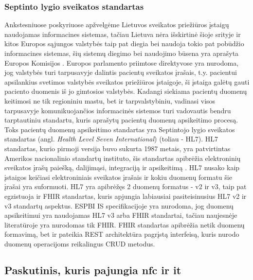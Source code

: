 \subsubsection{Septinto lygio sveikatos standartas}
Ankstesniuose poskyriuose apžvelgėme Lietuvos sveikatos priežiūros įstaigų naudojamas informacines sistemas, tačiau Lietuva nėra išskirtinė šioje srityje ir kitos Europos sąjungos valstybės taip pat diegia bei naudoja tokio pat pobūdžio informacines sistemas, šių sistemų diegimo bei naudojimo būsena yra aprašyta Europos Komisijos \cite{EuroposKomisija}. Europos parlamento priimtose direktyvose \cite{EuroposParlamentas} yra nurodoma, jog valstybės turi tarpusavyje dalintis pacientų sveikatos įrašais, t.y. pacientui apsilankius svetimos valstybės sveikatos priežiūros įstaigoje, ši įstaiga galėtų gauti paciento duomenis iš jo gimtosios valstybės. Kadangi siekiama pacientų duomenų keitimosi ne tik regioniniu mastu, bet ir tarpvalstybiniu, vadinasi visos tarpusavyje komunikuojančios informacinės sistemos turi vadovautis bendru tarptautiniu standartu, kuris aprašytų pacientų duomenų apsikeitimo procesą. Toks pacientų duomenų apsikeitimo standartas yra Septintojo lygio sveikatos standartas (angl. \textit{Health Level Seven International}) (toliau - HL7). HL7 standartas, kurio pirmoji versija buvo sukurta 1987 metais, yra patvirtintas Amerikos nacionalinio standartų instituto, šis standartas apibrėžia elektroninių sveikatos įrašų paiešką, dalijimąsi, integraciją ir apsikeitimą \cite{HL72009}. HL7 nusako kaip įstaigos keičiasi elektroniniais sveikatos įrašais ir kokiu duomenų formatu šie įrašai yra suformuoti. HL7 yra apibrėžęs 2 duomenų formatus - v2 ir v3, taip pat egzistuoja ir FHIR standartas, kuris apjungia labiausiai pasiteisinusius HL7 v2 ir v3 standartų aspektus. ESPBI IS specifikacijoje \cite{Specifikacija} yra nurodoma, jog duomenų apsikeitimui yra naudojamas HL7 v3 arba FHIR standartai, tačiau naujesnėje literatūroje \cite{Registrucentras} yra nurodomas tik FHIR. FHIR standartas apibrėžia netik duomenų formavimą, bet ir pateikia REST architektūra pagrįstą interfeisą, kuris nurodo
duomenų operacijoms reikalingus CRUD metodus.




\subsection{Paskutinis, kuris pajungia nfc ir it}

